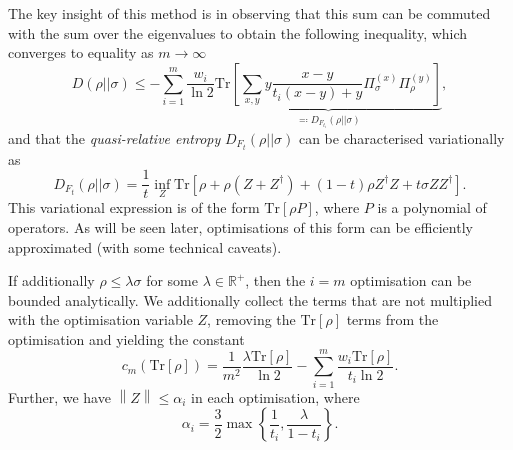 \documentclass[10pt, a4paper]{article}
\numberwithin{equation}{section} %
\theoremstyle{definition}
\theoremstyle{plain}
\newcommand{\norm}[1]{\left\lVert#1\right\rVert}
\newcommand{\?}{\mathrel{?}} %
\newcommand{\R}{\mathbb{R}} %
\newcommand{\Tr}{\mathrm{Tr}} %
\begin{document}
      The key insight of this method is in observing that this sum can be commuted with the sum over the eigenvalues to obtain the following inequality, which converges to equality as \(m\to\infty\)
      \begin{equation}
        D(\rho||\sigma) \leq - \sum_{i=1}^{m} \frac{w_i}{\ln 2} \underbrace{\Tr\left[ \sum_{x,y} y \frac{x-y}{t_i(x-y)+y} \Pi^{(x)}_{\sigma} \Pi^{(y)}_{\rho} \right]}_{\eqqcolon D_{F_{t_i}}(\rho||\sigma)},\label{eqn:re_from_qre}
      \end{equation}
      and that the \emph{quasi-relative entropy} \(D_{F_{t}}(\rho||\sigma)\) can be characterised variationally as
      \begin{equation}
        D_{F_{t}}(\rho||\sigma) = \frac{1}{t} \inf_Z \Tr\left[ \rho + \rho(Z + Z^{\dagger}) + (1-t)\rho{}Z^{\dagger}Z + t\sigma{}ZZ^{\dagger} \right].\label{eqn:qre_var}
      \end{equation}
      This variational expression is of the form \(\Tr[\rho P]\), where \(P\) is a polynomial of operators. As will be seen later, optimisations of this form can be efficiently approximated (with some technical caveats).

      If additionally \(\rho \leq \lambda\sigma\) for some \(\lambda \in \R^+\), then the \(i=m\) optimisation can be bounded analytically. We additionally collect the terms that are not multiplied with the optimisation variable \(Z\), removing the \(\Tr[\rho]\) terms from the optimisation and yielding the constant
      \begin{equation}
        c_m(\Tr[\rho]) = \frac{1}{m^2} \frac{\lambda \Tr[\rho]}{\ln 2} - \sum_{i=1}^m \frac{w_i \Tr[\rho]}{t_i \ln 2}.
      \end{equation}
      Further, we have \(\norm{Z} \leq \alpha_i\) in each optimisation, where
      \begin{equation}\label{eqn:qre_bound}
        \alpha_i = \frac{3}{2} \max\left\{\frac{1}{t_i}, \frac{\lambda}{1-t_i}\right\}.
      \end{equation}
\end{document}
